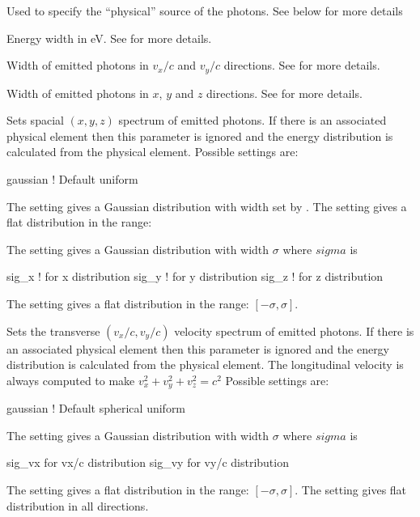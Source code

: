 {\begin{description}
  \item[\vn{physical_source}] \Newline
Used to specify the ``physical'' source of the photons. See below for more details

  \item[\vn{sig_E}] \Newline
Energy width in eV. See  for more
details.

  \item[\vn{sig_vx, sig_vy}] \Newline
Width of emitted photons in $v_x/c$ and $v_y/c$ directions. See
 for more details.

  \item[\vn{sig_x, sig_y, sig_z}] \Newline
Width of emitted photons in $x$, $y$ and $z$ directions. See
 for more details.

  \item[\vn{spatial_distribution}] \Newline
Sets spacial $(x, y, z)$ spectrum of emitted photons. If there is an
associated physical element then this parameter is ignored and the
energy distribution is calculated from the physical element. Possible
settings are:
\begin{example2}
  gaussian    ! Default
  uniform
\end{example2}
The  setting gives a Gaussian distribution with width
set by . The  setting gives a flat
distribution in the range:
\begin{example2}
\end{example2}
The  setting gives a Gaussian distribution with width
$\sigma$ where $sigma$ is 
\begin{example2}
  sig_x     ! for x distribution
  sig_y     ! for y distribution
  sig_z     ! for z distribution
\end{example2}
The  setting gives a flat
distribution in the range: $[-\sigma, \sigma]$.

  \item[\vn{velocity_distribution}] \Newline
Sets the transverse $(v_x/c, v_y/c)$ velocity spectrum of emitted
photons. If there is an associated physical element then this
parameter is ignored and the energy distribution is calculated from
the physical element. The longitudinal velocity is always computed to
make $v_x^2 + v_y^2 + v_z^2 = c^2$ Possible settings are:
\begin{example2}
  gaussian    ! Default
  spherical
  uniform
\end{example2}
The  setting gives a Gaussian distribution with width
$\sigma$ where $sigma$ is 
\begin{example2}
  sig_vx     for vx/c distribution
  sig_vy     for vy/c distribution
\end{example2}
The  setting gives a flat distribution in the range:
$[-\sigma, \sigma]$.
The  setting gives flat distribution in all directions.
  \end{description}

}
